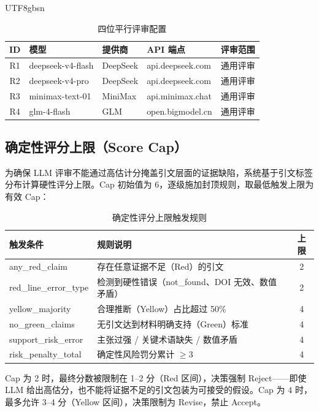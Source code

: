 \documentclass[11pt,a4paper]{article}
\begin{document}
\begin{CJK*}{UTF8}{gbsn}
\begin{table}[htbp]
\centering
\caption{四位平行评审配置}
\begin{tabular}{@{}clllc@{}}
\toprule
\textbf{ID} & \textbf{模型} & \textbf{提供商} & \textbf{API 端点} & \textbf{评审范围} \\
\midrule
R1 & deepseek-v4-flash  & DeepSeek & api.deepseek.com  & 通用评审 \\
R2 & deepseek-v4-pro    & DeepSeek & api.deepseek.com  & 通用评审 \\
R3 & minimax-text-01    & MiniMax  & api.minimax.chat  & 通用评审 \\
R4 & glm-4-flash        & GLM      & open.bigmodel.cn  & 通用评审 \\
\bottomrule
\end{tabular}
\end{table}



\subsection{确定性评分上限（Score Cap）}

为确保 LLM 评审不能通过高估计分掩盖引文层面的证据缺陷，系统基于引文标签分布计算硬性评分上限。Cap 初始值为 6，逐级施加封顶规则，取最低触发上限为有效 Cap：

\begin{table}[htbp]
\centering
\caption{确定性评分上限触发规则}
\begin{tabularx}{\textwidth}{@{}>{\ttfamily}l>{\raggedright\arraybackslash}Xc@{}}
\toprule
\textbf{触发条件} & \textbf{规则说明} & \textbf{上限} \\
\midrule
any\_red\_claim          & 存在任意证据不足（Red）的引文 & 2 \\
red\_line\_error\_type   & 检测到硬性错误（not\_found、DOI 无效、数值矛盾） & 2 \\
yellow\_majority         & 合理推断（Yellow）占比超过 50\% & 4 \\
no\_green\_claims        & 无引文达到材料明确支持（Green）标准 & 4 \\
support\_risk\_error     & 主张过强 / 关键术语缺失 / 数值矛盾 & 4 \\
risk\_penalty\_total     & 确定性风险罚分累计 $\ge 3$ & 4 \\
\bottomrule
\end{tabularx}
\end{table}

Cap 为 2 时，最终分数被限制在 1--2 分（Red 区间），决策强制 Reject——即使 LLM 给出高估分，也不能将证据不足的引文包装为可接受的假设。Cap 为 4 时，最多允许 3--4 分（Yellow 区间），决策限制为 Revise，禁止 Accept。


\end{CJK*}
\end{document}
